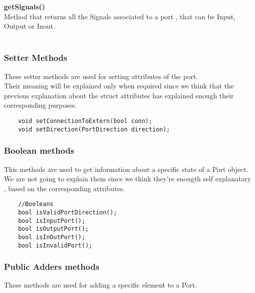 \documentclass{article}
\begin{document}
\textbf{getSignals()}\\
Method that returns all the Signals associated to a port , that can be Input, Output or Inout.\\\\

\subsubsection{Setter Methods}

These setter methods are used for setting attributes of the port.\\
Their meaning will be explained only when required since we think that the previous explanation about the struct attributes has explained enough their corresponding purposes.\\

\begin{mdframed}[hidealllines=true, backgroundcolor=magenta!10]
	\begin{lstlisting}
	void setConnectionToExtern(bool conn);
	void setDirection(PortDirection direction);
	\end{lstlisting}
\end{mdframed}

\subsubsection{Boolean methods}

This methods are used to get information about a specific state of a Port object.\\
We are not going to explain them since we think they're enougth self explanatory , based on the corresponding attributes.\\

\begin{mdframed}[hidealllines=true, backgroundcolor=magenta!10]
	\begin{lstlisting}
	//Booleans
	bool isValidPortDirection();
	bool isInputPort();
	bool isOutputPort();
	bool isInOutPort();
	bool isInvalidPort();
	\end{lstlisting}
\end{mdframed}

\subsubsection{Public Adders methods}

These methods are used for adding a specific element to a Port.\\
\end{document}
